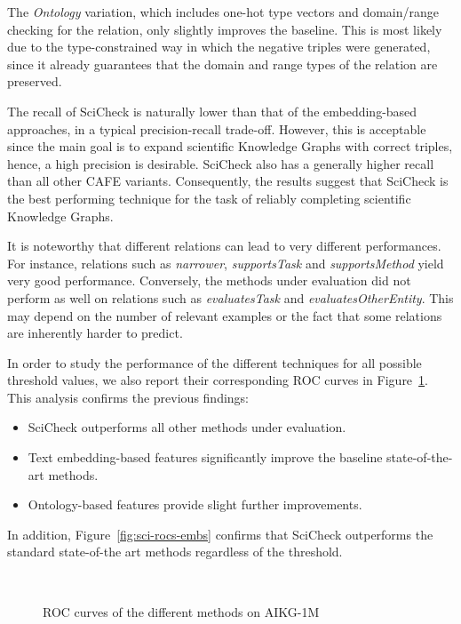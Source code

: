The \textit{Ontology} variation, which includes one-hot type vectors and domain/range checking for the relation, only slightly improves the baseline. This is most likely due to the type-constrained way in which the negative triples were generated, since it already guarantees that the domain and range types of the relation are preserved.

The recall of SciCheck is naturally lower than that of the embedding-based approaches, in a typical precision-recall trade-off. However, this is acceptable since the main goal is to expand scientific Knowledge Graphs with correct triples, hence, a high precision is desirable. SciCheck also has a generally higher recall than all other CAFE variants. Consequently, the results suggest that SciCheck is the best performing technique for the task of reliably completing scientific Knowledge Graphs.

It is noteworthy that different relations can lead to very different performances. For instance, relations such as \textit{narrower}, \textit{supportsTask} and \textit{supportsMethod} yield very good performance. Conversely, the methods under evaluation did not perform as well on relations such as  \textit{evaluatesTask} and \textit{evaluatesOtherEntity}. This may depend on the number of relevant examples or the fact that some relations are inherently harder to predict.

In order to study the performance of the different techniques for all possible threshold values, we also report their corresponding ROC curves in Figure~\ref{fig:sci-rocs}. This analysis confirms the previous findings:  

\begin{itemize}
    \item SciCheck outperforms all other methods under evaluation.
    \item Text embedding-based features significantly improve the baseline state-of-the-art methods.
    \item Ontology-based features provide slight further improvements.
\end{itemize}

In addition, Figure~\ref{fig:sci-rocs-embs} confirms that SciCheck outperforms the standard state-of-the art methods regardless of the threshold.

\begin{figure}[!htp]
    \centering
    \def\subfw{0.45\textwidth}
    
    ~
    
    \caption{ROC curves of the different methods on AIKG-1M}
    \label{fig:sci-rocs}
\end{figure}

